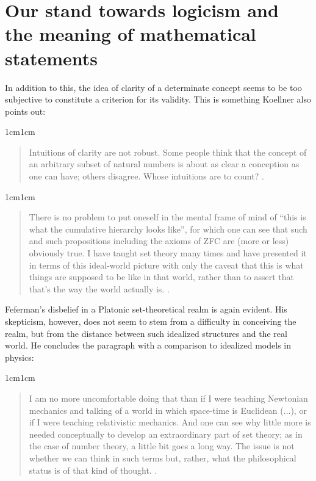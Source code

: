 \documentclass[11pt,a4paper]{book}
\begin{document}
\section{Our stand towards logicism and the meaning of mathematical statements}

In addition to this, the idea of clarity of a determinate concept seems to be too subjective to constitute a criterion for its validity. This is something Koellner also points out:

\begin{adjustwidth}{1cm}{1cm}
\begin{quote}
\small
Intuitions of clarity are not robust. Some people think that the concept of an arbitrary subset of natural numbers is about as clear a conception as one can have; others disagree. Whose intuitions are to count? \textcite[p. 14]{Koellner2022}.
\end{quote}
\end{adjustwidth}

\begin{adjustwidth}{1cm}{1cm}
\begin{quote}
\small
There is no problem to put oneself in the mental frame of mind of “this is what the cumulative hierarchy looks like”, for which one can see that such and such propositions including the axioms of ZFC are (more or less) obviously true. I have taught set theory many times and have presented it in terms of this ideal-world picture with only the caveat that this is what things are supposed to be like in that world, rather than to assert that that's the way the world actually is. \textcite[p. 19]{Feferman2011a}.
\end{quote}
\end{adjustwidth}

Feferman's disbelief in a Platonic set-theoretical realm is again evident. His skepticism, however, does not seem to stem from a difficulty in conceiving the realm, but from the distance between such idealized structures and the real world. He concludes the paragraph with a comparison to idealized models in physics:

\begin{adjustwidth}{1cm}{1cm}
\begin{quote}
\small
I am no more uncomfortable doing that than if I were teaching Newtonian mechanics and talking of a world in which space-time is Euclidean (...), or if I were teaching relativistic mechanics. And one can see why little more is needed conceptually to develop an extraordinary part of set theory; as in the case of number theory, a little bit goes a long way. The issue is not whether we can think in such terms but, rather, what the philosophical status is of that kind of thought. \textcite[p. 19]{Feferman2011a}.
\end{quote}
\end{adjustwidth}
\end{document}
